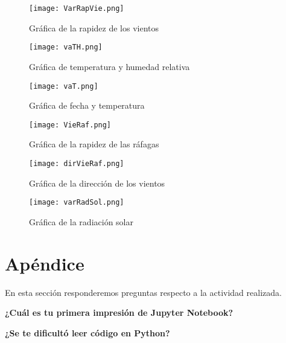 \documentclass[12pt]{article}
\begin{document}
\begin{figure}
\begin{centering}
  \texttt{[image: VarRapVie.png]}
  \caption{Gráfica de la rapidez de los vientos}
\end{centering}
\end{figure}

\begin{figure}
\begin{centering}
  \texttt{[image: vaTH.png]}
  \caption{Gráfica de temperatura y humedad relativa}
\end{centering}
\end{figure}

\begin{figure}
\begin{centering}
  \texttt{[image: vaT.png]}
  \caption{Gráfica de fecha y temperatura}
\end{centering}
\end{figure}

\begin{figure}
\begin{centering}
  \texttt{[image: VieRaf.png]}
  \caption{Gráfica de la rapidez de las ráfagas}
\end{centering}
\end{figure}

\begin{figure}
\begin{centering}
  \texttt{[image: dirVieRaf.png]}
  \caption{Gráfica de la dirección de los vientos}
\end{centering}
\end{figure}

\begin{figure}
\begin{centering}
  \texttt{[image: varRadSol.png]}
  \caption{Gráfica de la radiación solar}
\end{centering}
\end{figure}

\section{Apéndice}

En esta sección responderemos preguntas respecto a la actividad realizada.

\textbf{¿Cuál es tu primera impresión de Jupyter Notebook?}

\textbf{¿Se te dificultó leer código en Python?}
\end{document}
